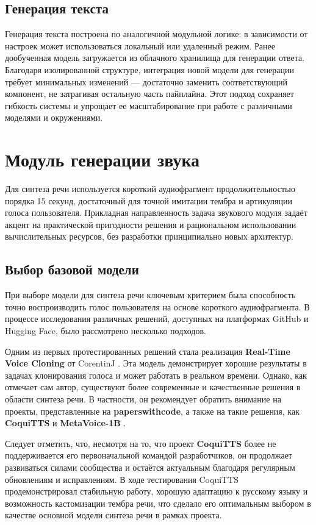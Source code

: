 \subsection{Генерация текста}
Генерация текста построена по аналогичной модульной логике: в зависимости от настроек может использоваться локальный или удаленный режим. Ранее дообученная модель загружается из облачного хранилища для генерации ответа. Благодаря изолированной структуре, интеграция новой модели для генерации требует минимальных изменений — достаточно заменить соответствующий компонент, не затрагивая остальную часть пайплайна.
Этот подход сохраняет гибкость системы и упрощает ее масштабирование при работе с различными моделями и окружениями.

\section{Модуль генерации звука}
Для синтеза речи используется короткий аудиофрагмент продолжительностью порядка 15 секунд,  
достаточный для точной имитации тембра и артикуляции голоса пользователя.
Прикладная направленность задача звукового модуля задаёт акцент на практической пригодности решения и рациональном  
использовании вычислительных ресурсов, без разработки принципиально новых архитектур.

\subsection{Выбор базовой модели}

При выборе модели для синтеза речи ключевым критерием была способность точно воспроизводить
голос пользователя на основе короткого аудиофрагмента. В процессе исследования различных
решений, доступных на платформах GitHub и Hugging Face, было рассмотрено несколько подходов.

Одним из первых протестированных решений стала реализация \textbf{Real-Time Voice Cloning}
от CorentinJ \cite{jemine2019voicecloning}. Эта модель демонстрирует хорошие результаты в задачах
клонирования голоса и может работать в реальном времени. Однако, как отмечает сам автор,
существуют более современные и качественные решения в области синтеза речи. В частности,
он рекомендует обратить внимание на проекты, представленные на \textbf{paperswithcode}, а
также на такие решения, как \textbf{CoquiTTS} \cite{coquitts} и \textbf{MetaVoice-1B} \cite{metavoice2024}.

Следует отметить, что, несмотря на то, что проект \textbf{CoquiTTS} более не поддерживается его первоначальной 
командой разработчиков, он продолжает развиваться силами сообщества и остаётся актуальным благодаря регулярным 
обновлениям и исправлениям. В ходе тестирования CoquiTTS продемонстрировал стабильную работу, хорошую адаптацию 
к русскому языку и возможность кастомизации тембра речи, что сделало его оптимальным выбором в качестве 
основной модели синтеза речи в рамках проекта.

